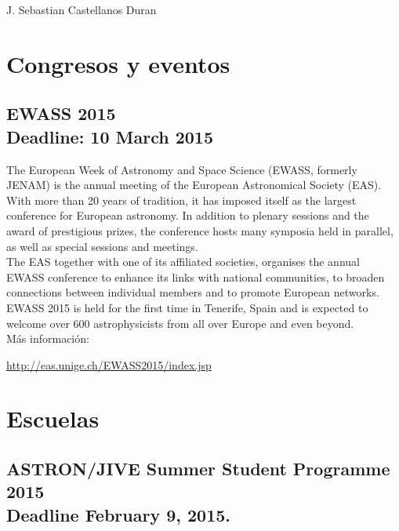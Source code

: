 \documentclass{book}
\begin{document}
\begin{flushright}
J. Sebastian Castellanos Duran
\end{flushright}

        \section*{Congresos y eventos}

\subsection{EWASS 2015\\ Deadline: 10 March 2015}

The European Week of Astronomy and Space Science (EWASS, formerly JENAM) is the annual meeting of the European Astronomical Society (EAS). With more than 20 years of tradition, it has imposed itself as the largest conference for European astronomy. In addition to plenary sessions and the award of prestigious prizes, the conference hosts many symposia held in parallel, as well as special sessions and meetings.\\

\noindent The EAS together with one of its affiliated societies, organises the annual EWASS conference to enhance its links with national communities, to broaden connections between individual members and to promote European networks.\\

\noindent EWASS 2015 is held for the first time in Tenerife, Spain and is expected to welcome over 600 astrophysicists from all over Europe and even beyond.\\

\noindent Más información:
\begin{center}
\url{ http://eas.unige.ch/EWASS2015/index.jsp}
\end{center}

\newpage
{}
                    \section*{Escuelas}

\subsection{ASTRON/JIVE Summer Student Programme 2015\\ Deadline February 9, 2015.}
\end{document}
